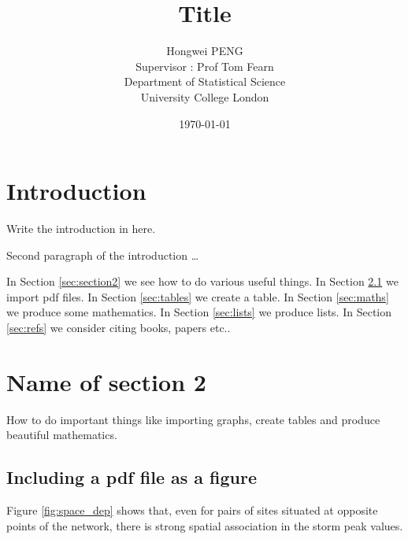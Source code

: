 \documentclass[a4paper,12pt,titlepage]{article} %
\title{Title}
\author{Hongwei PENG \vspace{2cm} \\
Supervisor : Prof Tom Fearn \vspace{2cm} \\
Department of Statistical Science \\
University College London}
\date{\today} %
\numberwithin{equation}{section}  %
\begin{document}
\maketitle         %
\tableofcontents   %
\newpage           %

\section{Introduction}             %
\label{sec:intro}                  %
Write the introduction in here.    %

Second paragraph of the introduction \ldots  %

\label{sec:structure}                        %
In Section \ref{sec:section2} we see how to do various useful things.
In Section \ref{sec:graphs} we import pdf files.
In Section \ref{sec:tables} we create a table. %
In Section \ref{sec:maths} we produce some mathematics.
In Section \ref{sec:lists} we produce lists.
In Section \ref{sec:refs} we consider citing books, papers etc..

\section{Name of section 2}                      %
How to do important things like importing graphs, create tables and produce beautiful mathematics.
\label{sec:section2}                             %
\subsection{Including a pdf file as a figure}    %
\label{sec:graphs}
Figure \ref{fig:space_dep} shows that, even for pairs of sites situated at opposite points of the network, there is strong spatial association in the storm peak values.
\end{document}
